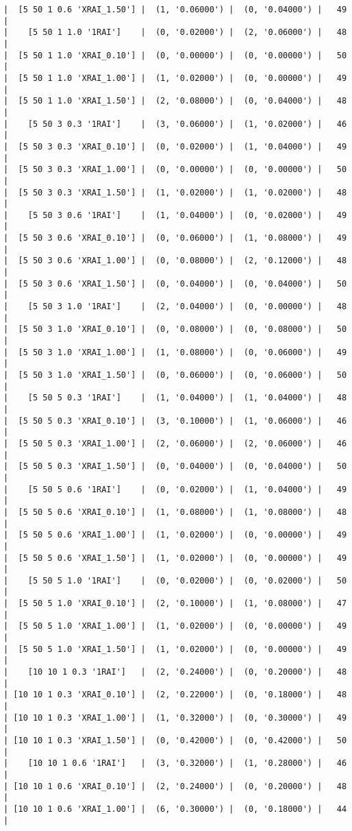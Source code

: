 \documentclass{article}
\begin{document}
\begin{verbatim}
|  [5 50 1 0.6 'XRAI_1.50'] |  (1, '0.06000') |  (0, '0.04000') |   49  |
|    [5 50 1 1.0 '1RAI']    |  (0, '0.02000') |  (2, '0.06000') |   48  |
|  [5 50 1 1.0 'XRAI_0.10'] |  (0, '0.00000') |  (0, '0.00000') |   50  |
|  [5 50 1 1.0 'XRAI_1.00'] |  (1, '0.02000') |  (0, '0.00000') |   49  |
|  [5 50 1 1.0 'XRAI_1.50'] |  (2, '0.08000') |  (0, '0.04000') |   48  |
|    [5 50 3 0.3 '1RAI']    |  (3, '0.06000') |  (1, '0.02000') |   46  |
|  [5 50 3 0.3 'XRAI_0.10'] |  (0, '0.02000') |  (1, '0.04000') |   49  |
|  [5 50 3 0.3 'XRAI_1.00'] |  (0, '0.00000') |  (0, '0.00000') |   50  |
|  [5 50 3 0.3 'XRAI_1.50'] |  (1, '0.02000') |  (1, '0.02000') |   48  |
|    [5 50 3 0.6 '1RAI']    |  (1, '0.04000') |  (0, '0.02000') |   49  |
|  [5 50 3 0.6 'XRAI_0.10'] |  (0, '0.06000') |  (1, '0.08000') |   49  |
|  [5 50 3 0.6 'XRAI_1.00'] |  (0, '0.08000') |  (2, '0.12000') |   48  |
|  [5 50 3 0.6 'XRAI_1.50'] |  (0, '0.04000') |  (0, '0.04000') |   50  |
|    [5 50 3 1.0 '1RAI']    |  (2, '0.04000') |  (0, '0.00000') |   48  |
|  [5 50 3 1.0 'XRAI_0.10'] |  (0, '0.08000') |  (0, '0.08000') |   50  |
|  [5 50 3 1.0 'XRAI_1.00'] |  (1, '0.08000') |  (0, '0.06000') |   49  |
|  [5 50 3 1.0 'XRAI_1.50'] |  (0, '0.06000') |  (0, '0.06000') |   50  |
|    [5 50 5 0.3 '1RAI']    |  (1, '0.04000') |  (1, '0.04000') |   48  |
|  [5 50 5 0.3 'XRAI_0.10'] |  (3, '0.10000') |  (1, '0.06000') |   46  |
|  [5 50 5 0.3 'XRAI_1.00'] |  (2, '0.06000') |  (2, '0.06000') |   46  |
|  [5 50 5 0.3 'XRAI_1.50'] |  (0, '0.04000') |  (0, '0.04000') |   50  |
|    [5 50 5 0.6 '1RAI']    |  (0, '0.02000') |  (1, '0.04000') |   49  |
|  [5 50 5 0.6 'XRAI_0.10'] |  (1, '0.08000') |  (1, '0.08000') |   48  |
|  [5 50 5 0.6 'XRAI_1.00'] |  (1, '0.02000') |  (0, '0.00000') |   49  |
|  [5 50 5 0.6 'XRAI_1.50'] |  (1, '0.02000') |  (0, '0.00000') |   49  |
|    [5 50 5 1.0 '1RAI']    |  (0, '0.02000') |  (0, '0.02000') |   50  |
|  [5 50 5 1.0 'XRAI_0.10'] |  (2, '0.10000') |  (1, '0.08000') |   47  |
|  [5 50 5 1.0 'XRAI_1.00'] |  (1, '0.02000') |  (0, '0.00000') |   49  |
|  [5 50 5 1.0 'XRAI_1.50'] |  (1, '0.02000') |  (0, '0.00000') |   49  |
|    [10 10 1 0.3 '1RAI']   |  (2, '0.24000') |  (0, '0.20000') |   48  |
| [10 10 1 0.3 'XRAI_0.10'] |  (2, '0.22000') |  (0, '0.18000') |   48  |
| [10 10 1 0.3 'XRAI_1.00'] |  (1, '0.32000') |  (0, '0.30000') |   49  |
| [10 10 1 0.3 'XRAI_1.50'] |  (0, '0.42000') |  (0, '0.42000') |   50  |
|    [10 10 1 0.6 '1RAI']   |  (3, '0.32000') |  (1, '0.28000') |   46  |
| [10 10 1 0.6 'XRAI_0.10'] |  (2, '0.24000') |  (0, '0.20000') |   48  |
| [10 10 1 0.6 'XRAI_1.00'] |  (6, '0.30000') |  (0, '0.18000') |   44  |

\end{verbatim}
\end{document}
